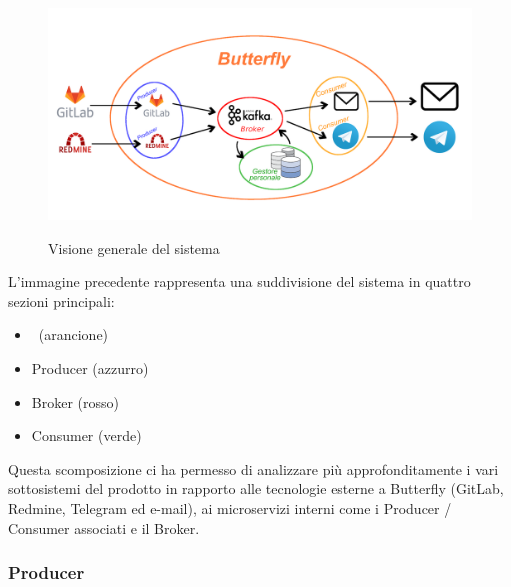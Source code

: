	\begin{figure}[H]
		\centering
		\includegraphics[width=\textwidth]{img/butterfly.png}\\
		\caption{Visione generale del sistema \progetto}
		\label{fig:butterfly}
	\end{figure}
\newpage
	L'immagine precedente rappresenta una suddivisione del sistema in quattro sezioni principali:
	\begin{itemize}
		\item \progetto\ (arancione)
		\item Producer (azzurro)
		\item Broker (rosso)
		\item Consumer (verde)
	\end{itemize}
	Questa scomposizione ci ha permesso di analizzare più approfonditamente i vari sottosistemi del prodotto in rapporto alle tecnologie esterne a Butterfly (GitLab, Redmine, Telegram ed e-mail), ai microservizi interni come i Producer / Consumer associati e il Broker.
	
	\subsubsection{Producer}\label{TecnologieProducer}
	
